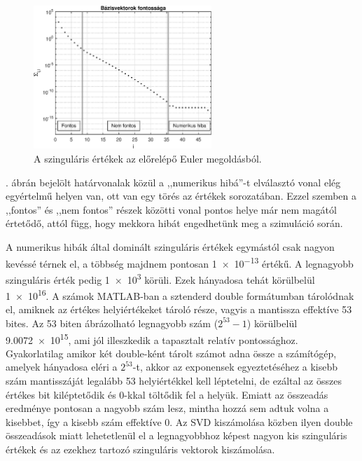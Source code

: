             \begin{figure}[h!]
                \centering
                \includegraphics[width=0.6\textwidth]{kep/euler_0.15_4_sv.eps}
                \caption{A szinguláris értékek az előrelépő Euler megoldásból.}
                \label{fig:sigma}
            \end{figure}
            . ábrán bejelölt határvonalak közül a ,,numerikus hibá''-t elválasztó vonal elég egyértelmű helyen van, ott van egy törés az értékek sorozatában. Ezzel szemben a ,,fontos'' és ,,nem fontos'' részek közötti vonal pontos helye már nem magától értetődő, attól függ, hogy mekkora hibát engedhetünk meg a szimuláció során.
            \par
            A numerikus hibák által dominált szinguláris értékek egymástól csak nagyon kevéssé térnek el, a többség majdnem pontosan \num{1e-13} értékű. A legnagyobb szinguláris érték pedig \num{1e3} körüli. Ezek hányadosa tehát körülbelül \num{1e16}. A számok MATLAB-ban a sztenderd double formátumban tárolódnak el, amiknek az értékes helyiértékeket tároló része, vagyis a mantissza effektíve 53 bites. Az 53 biten ábrázolható legnagyobb szám ($2^{53}-1$) körülbelül \num{9,0072e15}, ami jól illeszkedik a tapasztalt relatív pontossághoz. Gyakorlatilag amikor két double-ként tárolt számot adna össze a számítógép, amelyek hányadosa eléri a $2^{53}$-t, akkor az exponensek egyeztetéséhez a kisebb szám mantisszáját legalább 53 helyiértékkel kell léptetelni, de ezáltal az összes értékes bit kiléptetődik és 0-kkal töltődik fel a helyük. Emiatt az összeadás eredménye pontosan a nagyobb szám lesz, mintha hozzá sem adtuk volna a kisebbet, így a kisebb szám effektíve 0. Az SVD kiszámolása közben  ilyen double összeadások miatt lehetetlenül el a legnagyobbhoz képest nagyon kis szinguláris értékek és az ezekhez tartozó szinguláris vektorok kiszámolása.
            \par
